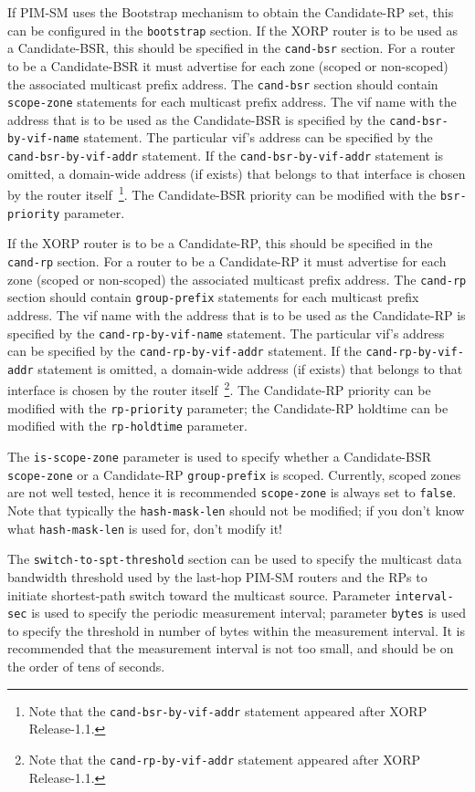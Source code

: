 If PIM-SM uses the Bootstrap mechanism to obtain the Candidate-RP set,
this can be configured in the {\tt bootstrap} section.
If the XORP router is to be used as a Candidate-BSR, this should be
specified in the {\tt cand-bsr} section.
For a router to be a Candidate-BSR it must advertise for
each zone (scoped or non-scoped) the associated multicast prefix address.
The {\tt cand-bsr} section should contain {\tt scope-zone} statements for each
multicast prefix address.
The vif name with the address that is to be used as the Candidate-BSR
is specified by the {\tt cand-bsr-by-vif-name} statement.
The particular vif's address can be specified by the
{\tt cand-bsr-by-vif-addr} statement. If the
{\tt cand-bsr-by-vif-addr} statement is omitted, a domain-wide
address (if exists) that belongs to that interface is chosen by the router
itself~\footnote{Note that the {\tt cand-bsr-by-vif-addr} statement
appeared after XORP Release-1.1.}.
The Candidate-BSR priority can be modified with the {\tt bsr-priority}
parameter.

If the XORP router is to be a Candidate-RP, this should be specified
in the {\tt cand-rp} section.
For a router to be a Candidate-RP it must advertise for
each zone (scoped or non-scoped) the associated multicast prefix address.
The {\tt cand-rp} section should contain {\tt group-prefix} statements
for each multicast prefix address.
The vif name with the address that is to be used as the Candidate-RP
is specified by the {\tt cand-rp-by-vif-name} statement.
The particular vif's address can be specified by the
{\tt cand-rp-by-vif-addr} statement. If the
{\tt cand-rp-by-vif-addr} statement is omitted, a domain-wide
address (if exists) that belongs to that interface is chosen by the router
itself~\footnote{Note that the {\tt cand-rp-by-vif-addr} statement
appeared after XORP Release-1.1.}.
The Candidate-RP priority can be modified with the
{\tt rp-priority} parameter; the Candidate-RP holdtime can be modified
with the {\tt rp-holdtime} parameter.

The {\tt is-scope-zone} parameter is used to specify whether a
Candidate-BSR {\tt scope-zone} or a Candidate-RP {\tt group-prefix} is
scoped. Currently, 
scoped zones are not well tested, hence it is recommended {\tt scope-zone}
is always set to {\tt false}.
Note that typically the {\tt hash-mask-len} should not be modified; if you
don't know what {\tt hash-mask-len} is used for, don't modify it!

The {\tt switch-to-spt-threshold} section can be used to specify the
multicast data bandwidth threshold used by the last-hop PIM-SM routers
and the RPs to initiate shortest-path switch toward the multicast source.
Parameter {\tt interval-sec} is used to specify the periodic measurement
interval;
parameter {\tt bytes} is used to specify the threshold in number of bytes
within the measurement interval. It is recommended that the measurement
interval is not too small, and should be on the order of tens of seconds.

